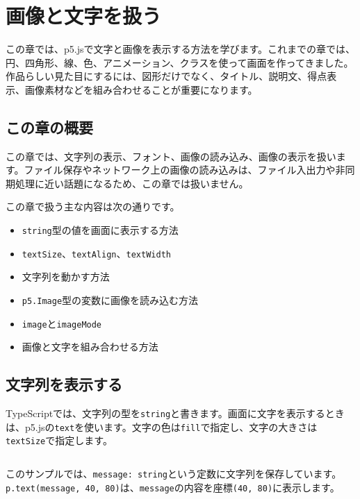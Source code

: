 \chapter{画像と文字を扱う}
\label{chap:images-and-text}

この章では、p5.jsで文字と画像を表示する方法を学びます。これまでの章では、円、四角形、線、色、アニメーション、クラスを使って画面を作ってきました。作品らしい見た目にするには、図形だけでなく、タイトル、説明文、得点表示、画像素材などを組み合わせることが重要になります。

\section{この章の概要}

この章では、文字列の表示、フォント、画像の読み込み、画像の表示を扱います。ファイル保存やネットワーク上の画像の読み込みは、ファイル入出力や非同期処理に近い話題になるため、この章では扱いません。

この章で扱う主な内容は次の通りです。

\begin{itemize}
    \item \texttt{string}型の値を画面に表示する方法
    \item \texttt{textSize}、\texttt{textAlign}、\texttt{textWidth}
    \item 文字列を動かす方法
    \item \texttt{p5.Image}型の変数に画像を読み込む方法
    \item \texttt{image}と\texttt{imageMode}
    \item 画像と文字を組み合わせる方法
\end{itemize}

\section{文字列を表示する}

TypeScriptでは、文字列の型を\texttt{string}と書きます。画面に文字を表示するときは、p5.jsの\texttt{text}を使います。文字の色は\texttt{fill}で指定し、文字の大きさは\texttt{textSize}で指定します。

\begin{listing}[htbp]
\inputminted{ts}{typescript-p5/listings/chapter12/basic-text.ts}
\caption{文字列を画面に表示する（\texttt{chapter12/basic-text.ts}）}
\label{lst:chapter12-basic-text}
\end{listing}

このサンプルでは、\texttt{message: string}という定数に文字列を保存しています。\texttt{p.text(message, 40, 80)}は、\texttt{message}の内容を座標\texttt{(40, 80)}に表示します。

